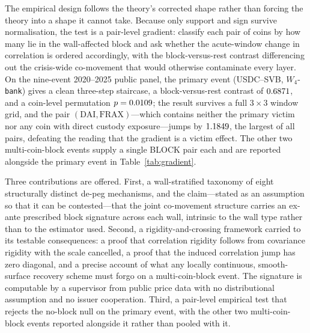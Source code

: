 The empirical design follows the theory's corrected shape rather than forcing the theory into a shape it cannot take. Because only support and sign survive normalisation, the test is a pair-level gradient: classify each pair of coins by how many lie in the wall-affected block and ask whether the acute-window change in correlation is ordered accordingly, with the block-versus-rest contrast differencing out the crisis-wide co-movement that would otherwise contaminate every layer. On the nine-event 2020--2025 public panel, the primary event (USDC--SVB, $W_4$-\texttt{bank}) gives a clean three-step staircase, a block-versus-rest contrast of $0.6871$, and a coin-level permutation $p = 0.0109$; the result survives a full $3\times3$ window grid, and the pair $(\text{DAI},\text{FRAX})$---which contains neither the primary victim nor any coin with direct custody exposure---jumps by $1.1849$, the largest of all pairs, defeating the reading that the gradient is a victim effect. The other two multi-coin-block events supply a single BLOCK pair each and are reported alongside the primary event in Table~\ref{tab:gradient}.

Three contributions are offered. First, a wall-stratified taxonomy of eight structurally distinct de-peg mechanisms, and the claim---stated as an assumption so that it can be contested---that the joint co-movement structure carries an ex-ante prescribed block signature across each wall, intrinsic to the wall type rather than to the estimator used. Second, a rigidity-and-crossing framework carried to its testable consequences: a proof that correlation rigidity follows from covariance rigidity with the scale cancelled, a proof that the induced correlation jump has zero diagonal, and a precise account of what any locally continuous, smooth-surface recovery scheme must forgo on a multi-coin-block event. The signature is computable by a supervisor from public price data with no distributional assumption and no issuer cooperation. Third, a pair-level empirical test that rejects the no-block null on the primary event, with the other two multi-coin-block events reported alongside it rather than pooled with it.

